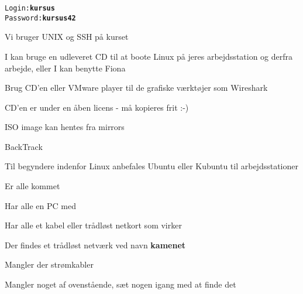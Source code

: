 \documentclass[20pt,landscape,a4paper,footrule]{foils}
\begin{document}
\begin{alltt}
Login: {\bf kursus}
Password: {\bf kursus42}
\end{alltt}



\begin{list1}
\item Vi bruger UNIX og SSH på kurset
\item I kan bruge en udleveret CD til at boote Linux på jeres
  arbejdsstation og derfra arbejde, eller I kan benytte Fiona
\item Brug CD'en eller VMware player til de grafiske værktøjer som Wireshark
\item CD'en er under en åben licens - må kopieres frit :-)
\item ISO image kan hentes fra mirrors
\item BackTrack 
\item Til begyndere indenfor Linux anbefales Ubuntu eller Kubuntu til
  arbejdsstationer
\end{list1}


\begin{list1}
\item Er alle kommet
\item Har alle en PC med
\item Har alle et kabel eller trådløst netkort som virker
\item Der findes et trådløst netværk ved navn {\bf kamenet}
\item Mangler der strømkabler
\item Mangler noget af ovenstående, sæt nogen igang med at finde det
\end{list1}
\end{document}
